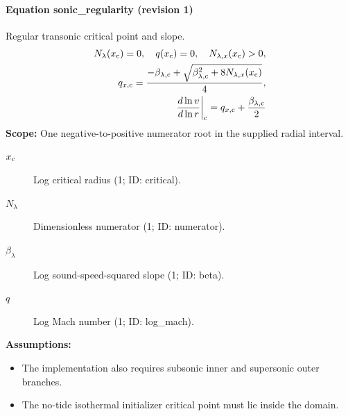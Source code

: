 \paragraph{Equation sonic\_regularity (revision 1)}
Regular transonic critical point and slope.
\begin{equation}
\begin{aligned}
N_\lambda(x_{\rm c})=0,\quad q(x_{\rm c})=0,\quad N_{\lambda,x}(x_{\rm c})>0,\\
q_{x,{\rm c}}=\frac{-\beta_{\lambda,{\rm c}}+\sqrt{\beta_{\lambda,{\rm c}}^2+8N_{\lambda,x}(x_{\rm c})}}{4},\\
\left.\frac{d\ln v}{d\ln r}\right|_{\rm c}=q_{x,{\rm c}}+\frac{\beta_{\lambda,{\rm c}}}{2}
\end{aligned}
\label{eq:escape.parker_5f_wind:sonic_5f_regularity:1}
\end{equation}
\noindent\textbf{Scope:} One negative-to-positive numerator root in the supplied radial interval.

\begin{description}
\item[$x_{\rm c}$] Log critical radius (1; ID: critical).
\item[$N_\lambda$] Dimensionless numerator (1; ID: numerator).
\item[$\beta_\lambda$] Log sound-speed-squared slope (1; ID: beta).
\item[$q$] Log Mach number (1; ID: log\_mach).
\end{description}

\noindent\textbf{Assumptions:}
\begin{itemize}
\item The implementation also requires subsonic inner and supersonic outer branches.
\item The no-tide isothermal initializer critical point must lie inside the domain.
\end{itemize}

